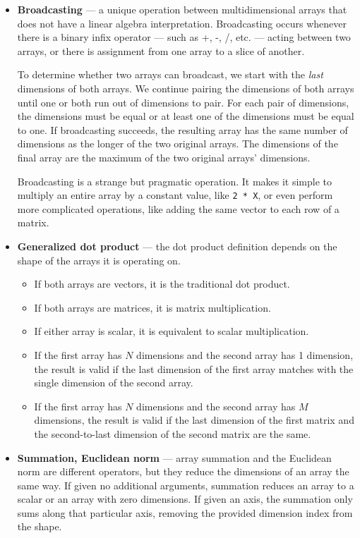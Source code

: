 \documentclass[12pt]{report}
\begin{document}
\begin{itemize}
    \item \textbf{Broadcasting} --- a unique operation between multidimensional arrays that does not have a linear algebra interpretation. Broadcasting occurs whenever there is a binary infix operator --- such as +, -, /, etc. --- acting between two arrays, or there is assignment from one array to a slice of another.

    To determine whether two arrays can broadcast, we start with the \textit{last} dimensions of both arrays. We continue pairing the dimensions of both arrays until one or both run out of dimensions to pair. For each pair of dimensions, the dimensions must be equal or at least one of the dimensions must be equal to one. If broadcasting succeeds, the resulting array has the same number of dimensions as the longer of the two original arrays. The dimensions of the final array are the maximum of the two original arrays' dimensions.

    Broadcasting is a strange but pragmatic operation. It makes it simple to multiply an entire array by a constant value, like \texttt{2 * X}, or even perform more complicated operations, like adding the same vector to each row of a matrix.

    \item \textbf{Generalized dot product} --- the dot product definition depends on the shape of the arrays it is operating on.
    \begin{itemize}
        \item If both arrays are vectors, it is the traditional dot product.
        \item If both arrays are matrices, it is matrix multiplication.
        \item If either array is scalar, it is equivalent to scalar multiplication.
        \item If the first array has $N$ dimensions and the second array has 1 dimension, the result is valid if the last dimension of the first array matches with the single dimension of the second array.
        \item If the first array has $N$ dimensions and the second array has $M$ dimensions, the result is valid if the last dimension of the first matrix and the second-to-last dimension of the second matrix are the same.
    \end{itemize}

    \item \textbf{Summation, Euclidean norm} --- array summation and the Euclidean norm are different operators, but they reduce the dimensions of an array the same way. If given no additional arguments, summation reduces an array to a scalar or an array with zero dimensions. If given an axis, the summation only sums along that particular axis, removing the provided dimension index from the shape.


\end{itemize}
\end{document}
